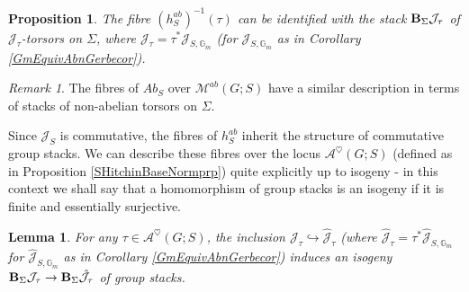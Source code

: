 \documentclass{amsart}
\newtheorem{lemma}[theorem]{Lemma}
\newtheorem{proposition}[theorem]{Proposition}
\theoremstyle{remark}
\newtheorem{remark}[theorem]{Remark}
\numberwithin{theorem}{section}
\numberwithin{equation}{section}
\begin{document}
\begin{proposition}\label{AbnisedSHitchinFibresprp}
    The fibre $(h_S^{ab})^{-1}(\tau)$ can be identified with the stack ${\bf B}_\Sigma\mathcal J_\tau$ of $\mathcal J_\tau$-torsors on $\Sigma$, where $\mathcal J_\tau = \tau^*\mathcal J_{S, \mathbb{G}_m}$ (for $\mathcal J_{S, \mathbb{G}_m}$ as in Corollary \ref{GmEquivAbnGerbecor}).
\end{proposition}

\begin{remark}\label{AbnisedSHitchinFibresrmk}
    The fibres of $Ab_S$ over $\mathcal M^{ab}(G;S)$ have a similar description in terms of stacks of non-abelian torsors on $\Sigma$. 
\end{remark}

Since $\mathcal J_S$ is commutative, the fibres of $h_S^{ab}$ inherit the structure of commutative group stacks. We can describe these fibres over the locus $\mathcal A^\heartsuit(G;S)$ (defined as in Proposition \ref{SHitchinBaseNormprp}) quite explicitly up to isogeny - in this context we shall say that a homomorphism of group stacks is an isogeny if it is finite and essentially surjective.

\begin{lemma}\label{PicardStackIsogenylem}
   For any $\tau \in \mathcal A^\heartsuit(G;S)$, the inclusion $\mathcal J_\tau \hookrightarrow \hat{\mathcal J}_\tau$ (where $\hat{\mathcal J}_\tau = \tau^*\hat{\mathcal J}_{S, \mathbb{G}_m}$ for $\hat{\mathcal J}_{S, \mathbb{G}_m}$ as in Corollary \ref{GmEquivAbnGerbecor}) induces an isogeny ${\bf B}_\Sigma \mathcal J_\tau \rightarrow {\bf B}_\Sigma \hat{\mathcal J}_\tau$ of group stacks. 
\end{lemma}
\end{document}
